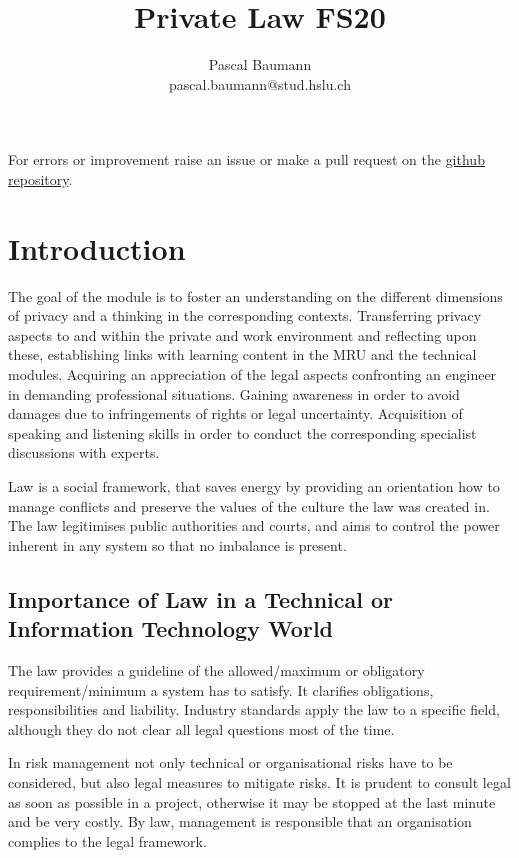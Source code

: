 \documentclass[11pt]{article}
\theoremstyle{definition}
\begin{document}
	
\title{Private Law FS20}
\author{Pascal Baumann\\pascal.baumann@stud.hslu.ch}
\maketitle



For errors or improvement raise an issue or make a pull request on the \href{https://github.com/KilnOfTheSecondFlame/mse_summaries}{github repository}.

\tableofcontents
\newpage



\section{Introduction}
The goal of the module is to foster an understanding on the different dimensions of privacy and a thinking in the corresponding contexts. Transferring privacy aspects to
and within the private and work environment and reflecting upon these, establishing links with learning content in the MRU and the technical modules. Acquiring an appreciation of the legal aspects confronting an engineer in demanding professional situations. Gaining awareness in order to avoid damages due to infringements of rights or legal uncertainty. Acquisition of speaking and listening
skills in order to conduct the corresponding specialist discussions with experts.

Law is a social framework, that saves energy by providing an orientation how to manage conflicts and preserve the values of the culture the law was created in. The law legitimises public authorities and courts, and aims to control the power inherent in any system so that no imbalance is present. 

\subsection{Importance of Law in a Technical or Information Technology World}

The law provides a guideline of the allowed/maximum or obligatory requirement/minimum a system has to satisfy. It clarifies obligations, responsibilities and liability. Industry standards apply the law to a specific field, although they do not clear all legal questions most of the time.

In risk management not only technical or organisational risks have to be considered, but also legal measures to mitigate risks. It is prudent to consult legal as soon as possible in a project, otherwise it may be stopped at the last minute and be very costly. By law, management is responsible that an organisation complies to the legal framework.
\end{document}
